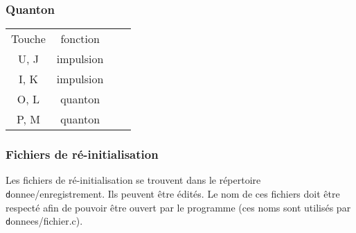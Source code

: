 \subsubsection{Quanton}
%
\begin{center}
\begin{tabular}{cc cc}%
Touche & fonction \\
U, J & impulsion &\\
I, K & impulsion &\\
O, L & quanton &\\
P, M & quanton &\\
\end{tabular}
\end{center}

\subsubsection{Fichiers de ré-initialisation}
Les fichiers de ré-initialisation se trouvent dans le répertoire {\texttt donnee/enregistrement}. Ils peuvent être édités. Le nom de ces fichiers doit être respecté afin de pouvoir être ouvert par le programme (ces noms sont utilisés par {\texttt donnees/fichier.c}).
%
%
